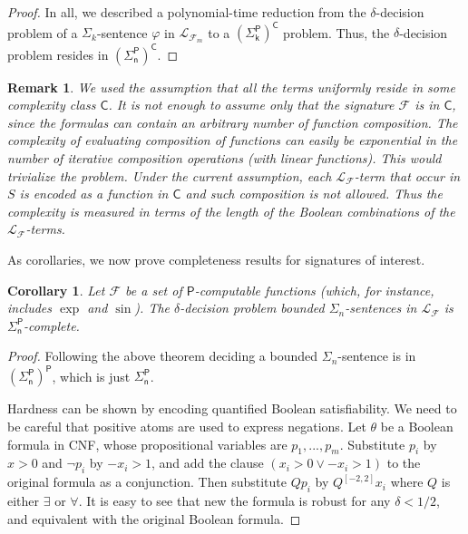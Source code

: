 \documentclass[conference]{IEEEtran}
\newtheorem{corollary}[theorem]{Corollary}
\newtheorem{remark}[theorem]{Remark}
\begin{document}
\begin{proof}

In all, we described a polynomial-time reduction from the $\delta$-decision problem of a $\Sigma_k$-sentence $\varphi$ in $\mathcal{L}_{\mathcal{F}_m}$ to a $\mathsf{(\Sigma_k^P)^C}$ problem. Thus, the $\delta$-decision problem resides in $\mathsf{(\Sigma_n^P)^C}$. 
\end{proof}

\begin{remark}
We used the assumption that all the terms uniformly reside in some complexity class $\mathsf{C}$. It is not enough to assume only that the signature $\mathcal{F}$ is in $\mathsf{C}$, since the formulas can contain an arbitrary number of function composition. The complexity of evaluating composition of functions can easily be exponential in the number of iterative composition operations (with linear functions). This would trivialize the problem. Under the current assumption, each $\mathcal{L}_{\mathcal{F}}$-term that occur in $S$ is encoded as a function in $\mathsf{C}$ and such composition is not allowed. Thus the complexity is measured in terms of the length of the Boolean combinations of the $\mathcal{L}_{\mathcal{F}}$-terms.
\end{remark}

As corollaries, we now prove completeness results for signatures of interest. 

\begin{corollary}
Let $\mathcal{F}$ be a set of $\mathsf{P}$-computable functions (which, for instance, includes $\exp$ and $\sin$). The $\delta$-decision problem bounded $\Sigma_n$-sentences in $\mathcal{L}_{\mathcal{F}}$ is $\mathsf{\Sigma_n^P}$-complete. 
\end{corollary}

\begin{proof} Following the above theorem deciding a bounded $\Sigma_n$-sentence is in $\mathsf{(\Sigma_n^P)}^{\mathsf{P}}$, which is just $\mathsf{\Sigma_n^P}$.

Hardness can be shown by encoding quantified Boolean satisfiability. We need to be careful that positive atoms are used to express negations. Let $\theta$ be a Boolean formula in CNF, whose propositional variables are $p_1,...,p_m$. Substitute $p_i$ by $x>0$ and $\neg p_i$ by $-x_i>1$, and add the clause $(x_i>0\vee -x_i>1)$ to the original formula as a conjunction. Then substitute $Q p_i$ by $Q^{[-2,2]}x_i$ where $Q$ is either $\exists$ or $\forall$. It is easy to see that new the formula is robust for any $\delta<1/2$, and equivalent with the original Boolean formula.
\end{proof}
\end{document}
